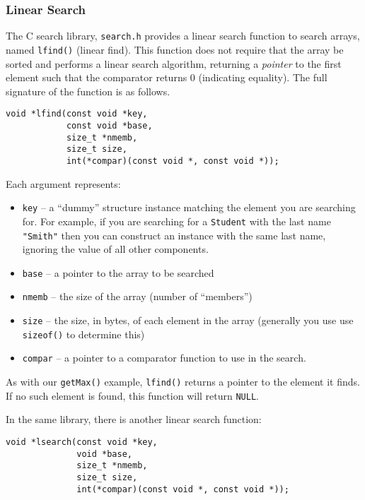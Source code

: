 \subsubsection{Linear Search}

The C search library, \texttt{search.h} provides a linear search 
function to search arrays, named \texttt{lfind()} (linear find).  This
function does not require that the array be sorted and performs a linear
search algorithm, returning a \emph{pointer} to the first element such that
the comparator returns 0 (indicating equality).  The full signature of the
function is as follows.

\begin{verbatim}
void *lfind(const void *key, 
            const void *base, 
            size_t *nmemb, 
            size_t size, 
            int(*compar)(const void *, const void *));
\end{verbatim}

Each argument represents:
\begin{itemize}
  \item \texttt{key} -- a ``dummy'' structure instance matching the
    element you are searching for.  For example, if you are searching for a
    \texttt{Student} with the last name \texttt{"Smith"} then
    you can construct an instance with the same last name, ignoring the value
    of all other components.  
  \item \texttt{base} -- a pointer to the array to be searched
  \item \texttt{nmemb} -- the size of the array (number of ``members'')
  \item \texttt{size} -- the size, in bytes, of each element in the array
   	(generally you use use \texttt{sizeof()} to determine this)
  \item \texttt{compar} -- a pointer to a comparator function to use
    in the search.
\end{itemize}

As with our \texttt{getMax()} example, \texttt{lfind()} returns
a pointer to the element it finds.  If no such element is found, this function
will return \texttt{NULL}.  

In the same library, there is another linear search function:

\begin{verbatim}
void *lsearch(const void *key, 
              void *base, 
              size_t *nmemb,
              size_t size, 
              int(*compar)(const void *, const void *));
\end{verbatim}

